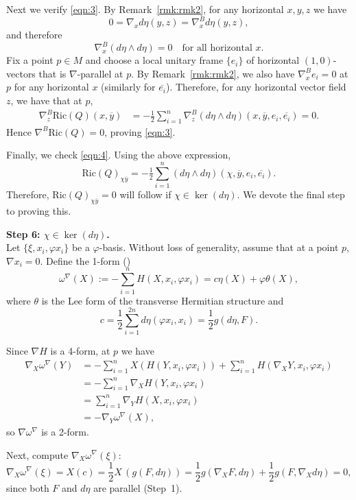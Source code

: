 \documentclass{article}
\makeatletter
\renewenvironment{proof}[1][\proofname]{%
  \par\pushQED{\qed}%
  \normalfont\topsep6\p@\@plus6\p@\relax
  \trivlist
  \item[\hskip\labelsep
        \textbf{\textup{#1}}\@addpunct{.}]\ignorespaces
}{%
  \popQED\endtrivlist\@endpefalse
}
\theoremstyle{definition}
\renewcommand{\phi}{\varphi}
\numberwithin{equation}{section}
\makeatother
\begin{document}
\begin{proof}[Proof of Theorem~\ref{thm:CKL}]
\medskip
Next we verify \eqref{eqn:3}. By Remark~\ref{rmk:rmk2}, for any horizontal \(x,y,z\) we have
\[
0 = \nabla_x d\eta(y,z) = \nabla^B_x d\eta(y,z),
\]
and therefore
\[
\nabla^B_x(d\eta \wedge d\eta) = 0 \quad \text{for all horizontal } x.
\]
Fix a point \(p \in M\) and choose a local unitary frame \(\{e_i\}\) of horizontal \((1,0)\)-vectors that is \(\nabla\)-parallel at \(p\). By Remark~\ref{rmk:rmk2}, we also have \(\nabla^B_x e_i = 0\) at \(p\) for any horizontal \(x\) (similarly for \(\overline{e_i}\)). Therefore, for any horizontal vector field \(z\), we have that at \(p\),
\[
\begin{split}
\nabla^B_z \mathrm{Ric}(Q)(x,\overline{y})
&= -\tfrac{1}{2} \sum_{i=1}^n \nabla^B_z (d\eta \wedge d\eta)(x,\overline{y},e_i,\overline{e_i})= 0.
\end{split}
\]
Hence \(\nabla^B \mathrm{Ric}(Q) = 0\), proving \eqref{eqn:3}.

\medskip
Finally, we check \eqref{eqn:4}. Using the above expression,
\[
\mathrm{Ric}(Q)_{\chi \overline{y}} = -\tfrac{1}{2} \sum_{i=1}^n (d\eta \wedge d\eta)(\chi, \overline{y}, e_i, \overline{e_i}).
\]
Therefore, \(\mathrm{Ric}(Q)_{\chi \overline{y}} = 0\) will follow if \(\chi \in \ker(d\eta)\). We devote the final step to proving this.

\medskip
\noindent
\textbf{Step 6: \(\chi \in \ker(d\eta)\).}  \\
Let \(\{\xi, x_i, \phi x_i\}\) be a \(\phi\)-basis. Without loss of generality, assume that at a point \(p\), \(\nabla x_i = 0\). Define the 1-form (\cite{FI})
\[
\omega^\nabla(X) := -\sum_{i=1}^n H(X,x_i,\phi x_i) = c \eta(X) + \phi \theta(X),
\]
where \(\theta\) is the Lee form of the transverse Hermitian structure and 
\[
c= \frac{1}{2}\sum_{i=1}^{2n} d\eta (\phi x_i, x_i)=\frac{1}{2}g(d\eta, F).
\]

\medskip
Since \(\nabla H\) is a 4-form, at \(p\) we have
\[
\begin{split}
\nabla_X \omega^\nabla(Y)
&= -\sum_{i=1}^n X(H(Y,x_i,\phi x_i)) + \sum_{i=1}^n H(\nabla_X Y, x_i, \phi x_i) \\
&= -\sum_{i=1}^n \nabla_X H(Y,x_i,\phi x_i) \\
&= \sum_{i=1}^n \nabla_Y H(X,x_i,\phi x_i) \\
&= -\nabla_Y \omega^\nabla(X),
\end{split}
\]
so \(\nabla \omega^\nabla\) is a 2-form.

\medskip
Next, compute \(\nabla_X \omega^\nabla(\xi)\):
\[
\nabla_X \omega^\nabla(\xi) = X(c ) = \frac{1}{2} X\, (g(F,d\eta))= \frac{1}{2} g(\nabla_X F,d\eta)+\frac{1}{2} g(F,\nabla_X d\eta)=0,
\]
since both \(F\) and \(d\eta\) are parallel (Step~1).


\end{proof}
\end{document}
